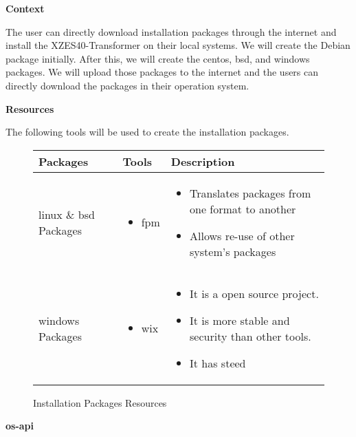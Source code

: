 \textbf{Context}

The user can directly download installation packages through the internet and install the XZES40-Transformer on their local systems.
We will create the Debian package initially.
After this, we will create the \gls{centos}, \gls{bsd}, and \gls{windows} packages.
We will upload those packages to the internet and the users can directly download the packages in their operation system.

\textbf{Resources}

The following tools will be used to create the installation packages. 
\begin{figure}
\begin{center}                                                                       
    \begin{tabular}{ | p{2.5cm} | p{5cm} | p{5cm} | }
    \hline
      Packages & Tools & Description \\ \hline
      \gls{linux} \& \gls{bsd} Packages  & 
      \begin{itemize}
      \item \gls{fpm}
      \end{itemize} &
      \begin{itemize}
      \item Translates packages from one format to another
      \item Allows re-use of other system's packages
      \end{itemize} \\ \hline

      \gls{windows} Packages & 
      \begin{itemize}
      \item \gls{wix}
      \end{itemize} &
      \begin{itemize}
      \item It is a open source project.
      \item It is more stable and security than other tools.
      \item It has steed
      \end{itemize} \\ \hline

    \end{tabular}
\end{center}
\caption{Installation Packages Resources}
\end{figure}
\textbf{\gls{os-api}}
\label{os-agnostic-api}


